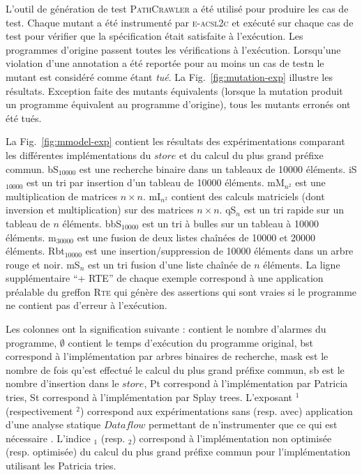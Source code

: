 \begin{description}
L'outil de génération de test \textsc{PathCrawler} \cite{PathCrawler} a été
utilisé pour produire les cas de test. Chaque mutant a été instrumenté par
\textsc{e-acsl2c} et exécuté sur chaque cas de test pour vérifier que la
spécification était satisfaite à l'exécution. Les programmes d'origine passent
toutes les vérifications à l'exécution. Lorsqu'une violation d'une annotation a
été reportée pour au moins un cas de testn le mutant est considéré comme étant
{\em tué}. La Fig.~\ref{fig:mutation-exp} illustre les résultats. Exception
faite des mutants équivalents (lorsque la mutation produit un programme
équivalent au programme d'origine), tous les mutants erronés ont été tués.

\end{description}

La Fig.~\ref{fig:mmodel-exp} contient les résultats des expérimentations
comparant les différentes implémentations du $store$ et du calcul du plus grand
préfixe commun. bS$_{10000}$ est une recherche binaire dans un tableaux de 10000
éléments. iS$_{10000}$ est un tri par insertion d'un tableau de 10000 éléments.
mM$_{n^2}$ est une multiplication de matrices $n \times n$. mI$_{n^2}$ contient
des calculs matriciels (dont inversion et multiplication) sur des  matrices
$n \times n$. qS$_n$ est un tri rapide sur un tableau de $n$ éléments.
bbS$_{10000}$ est un tri à bulles sur un tableau à 10000 éléments. m$_{30000}$ est
une fusion de deux listes chaînées de 10000 et 20000 éléments. Rbt$_{10000}$ est
une insertion/suppression de 10000 éléments dans un arbre rouge et noir. mS$_n$
est un tri fusion d'une liste chaînée de $n$ éléments. La ligne supplémentaire
``+ RTE'' de chaque exemple correspond à une application préalable du greffon
\textsc{Rte} qui génère des assertions qui sont vraies si le programme ne
contient pas d'erreur à l'exécution.

Les colonnes ont la signification suivante : \danger contient le nombre
d'alarmes du programme,  $\emptyset$ contient le temps d'exécution du programme
original, bst correspond à l'implémentation par arbres binaires de recherche,
mask est le nombre de fois qu'est effectué le calcul du plus grand préfixe
commun, sb est le nombre d'insertion dans le $store$, Pt correspond à
l'implémentation par Patricia tries, St correspond à l'implémentation par Splay
trees. L'exposant $^1$ (respectivement $^2$) correspond aux expérimentations
sans (resp. avec) application d'une analyse statique $Dataflow$ permettant de
n'instrumenter que ce qui est nécessaire \cite{TODO}. L'indice $_1$ (resp. $_2$)
correspond à l'implémentation non optimisée (resp. optimisée) du calcul du
plus grand préfixe commun pour l'implémentation utilisant les Patricia tries.

